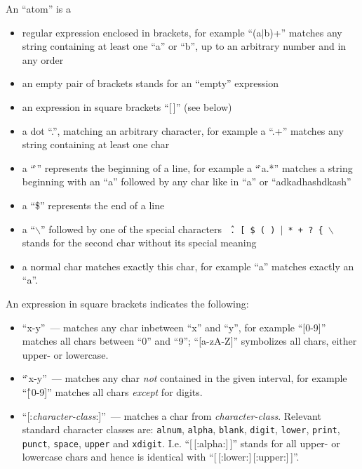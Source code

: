 An ``atom'' is a
\begin{itemize}
\item  regular expression enclosed in brackets, for example ``(a$|$b)+''
          matches any string containing at least one ``a'' or ``b'', up to an arbitrary
          number and in any order
        \item   an empty pair of brackets stands for an ``empty'' expression
        \item   an expression in square brackets ``[\,]'' (see below)
        \item a dot ``.'', matching an arbitrary character, for example
          a ``.+'' matches any string containing at least one char
        \item a ``\^\,'' represents the beginning of a line, for example a ``\^\,a.*''
          matches a string beginning with an ``a'' followed by any char like in
          ``a'' or ``adkadhashdkash''
        \item a ``\$'' represents the end of a line
        \item a ``$\backslash$'' followed by one of the special characters
          \texttt{\^\,.\,[\,\$\,(\,)\,$|$\,*\,+\,?\,\{\,$\backslash$} stands for the second char
          without its special meaning
        \item  a normal char matches exactly this char, for example
          ``a'' matches exactly an ``a''.
\end{itemize}

An expression in square brackets indicates the following:
\begin{itemize}
\item ``x-y''~--- matches any char inbetween ``x'' and ``y'', for example ``[0-9]''
                  matches all chars between ``0'' and ``9''; ``[a-zA-Z]'' symbolizes all chars,
                  either upper- or lowercase.

                \item ``\^\,x-y''~--- matches any char \emph{not} contained in the given interval,
                  for example ``[\^\,0-9]'' matches all chars \emph{except} for digits.

                \item ``[:\emph{character-class}:]''~--- matches a char from \emph{character-class}.
                Relevant standard character classes are: \texttt{alnum}, \texttt{alpha}, \texttt{blank},
                \texttt{digit}, \texttt{lower}, \texttt{print}, \texttt{punct}, \texttt{space}, \texttt{upper}
                and \texttt{xdigit}. I.e. ``[\,[:alpha:]\,]'' stands for all upper- or lowercase chars and hence
                is identical with ``[\,[:lower:]\,[:upper:]\,]''.
\end{itemize}


